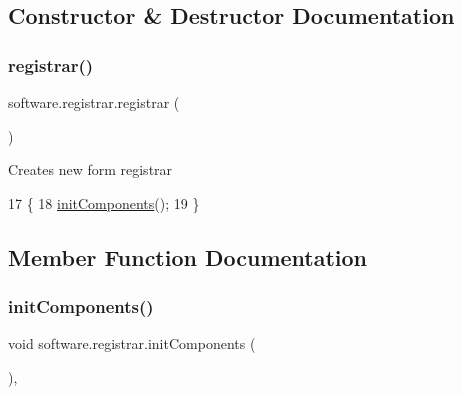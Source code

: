 \subsection{Constructor \& Destructor Documentation}
\mbox{\label{classsoftware_1_1registrar_a0960abe4e8b2d8f5a2c945ce37b280db}} 
\subsubsection{\texorpdfstring{registrar()}{registrar()}}
{\footnotesize\ttfamily software.\+registrar.\+registrar (\begin{DoxyParamCaption}{ }\end{DoxyParamCaption})\hspace{0.3cm}{\ttfamily [inline]}}

Creates new form registrar 
\begin{DoxyCode}
17                        \{
18         \mbox{\hyperlink{classsoftware_1_1registrar_a4a44ac73e408828398224b3b183152d6}{initComponents}}();
19     \}
\end{DoxyCode}


\subsection{Member Function Documentation}
\mbox{\label{classsoftware_1_1registrar_a4a44ac73e408828398224b3b183152d6}} 
\subsubsection{\texorpdfstring{init\+Components()}{initComponents()}}
{\footnotesize\ttfamily void software.\+registrar.\+init\+Components (\begin{DoxyParamCaption}{ }\end{DoxyParamCaption})\hspace{0.3cm}{\ttfamily [inline]}, {\ttfamily [private]}}

